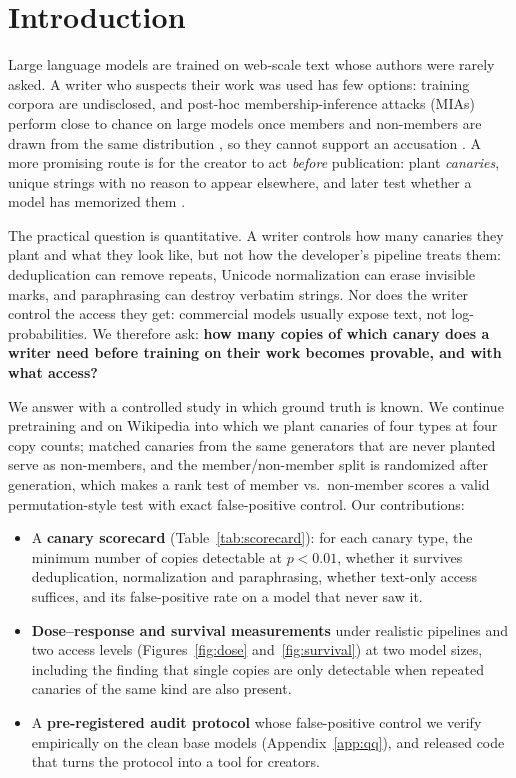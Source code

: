 \section{Introduction}
Large language models are trained on web-scale text whose authors were rarely asked. A writer who suspects their
work was used has few options: training corpora are undisclosed, and post-hoc membership-inference attacks (MIAs)
perform close to chance on large models once members and non-members are drawn from the same distribution
\citep{duan2024membership,das2024blind}, so they cannot support an accusation
\citep{zhang2024membership}. A more promising route is for the creator to act \emph{before} publication: plant
\emph{canaries}, unique strings with no reason to appear elsewhere, and later test whether a model has memorized
them \citep{carlini2019secret,meeus2024copyright,wei2024proving}.

The practical question is quantitative. A writer controls how many canaries they plant and what they look like,
but not how the developer's pipeline treats them: deduplication can remove repeats, Unicode normalization can
erase invisible marks, and paraphrasing can destroy verbatim strings. Nor does the writer control the access they
get: commercial models usually expose text, not log-probabilities. We therefore ask:
\textbf{how many copies of which canary does a writer need before training on their work becomes provable, and
with what access?}

We answer with a controlled study in which ground truth is known. We continue pretraining  and 
\citep{biderman2023pythia} on Wikipedia into which we plant canaries of four types at four copy counts; matched
canaries from the same generators that are never planted serve as non-members, and the member/non-member split
is randomized after generation, which makes a rank test of member vs.\ non-member scores a valid permutation-style
test with exact false-positive control. Our contributions:
\begin{itemize}
  \item A \textbf{canary scorecard} (Table~\ref{tab:scorecard}): for each canary type, the minimum number of copies
        detectable at $p<0.01$, whether it survives deduplication, normalization and paraphrasing, whether
        text-only access suffices, and its false-positive rate on a model that never saw it.
  \item \textbf{Dose--response and survival measurements} under realistic pipelines and two access levels
        (Figures~\ref{fig:dose} and~\ref{fig:survival}) at two model sizes, including the finding that single copies are only detectable when repeated canaries of the same kind are also present.
  \item A \textbf{pre-registered audit protocol} whose false-positive control we verify empirically on the clean
        base models (Appendix~\ref{app:qq}), and released code that turns the protocol into a tool for creators.
\end{itemize}
